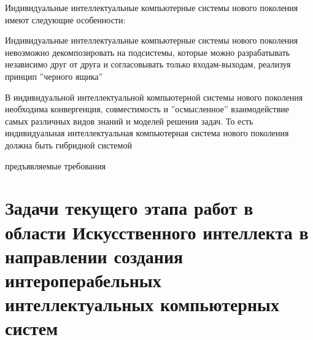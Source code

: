 Индивидуальные интеллектуальные компьютерные системы нового поколения имеют следующие особенности:

\begin{textitemize}
	\item Индивидуальные интеллектуальные компьютерные системы нового поколения невозможно декомпозировать на подсистемы, которые можно разрабатывать независимо друг от друга и согласовывать только входам-выходам, реализуя принцип ''черного ящика''
	\item В индивидуальной интеллектуальной компьютерной системы нового поколения необходима конвергенция, совместимость и ''осмысленное'' взаимодействие самых различных видов знаний и моделей решения задач. То есть индивидуальная интеллектуальная компьютерная система нового поколения должна быть гибридной системой
\end{textitemize}

\begin{SCn}
	\begin{scnrelfromlist}{предъявляемые требования}
	\end{scnrelfromlist}
\end{SCn}

\section*{Задачи текущего этапа работ в области Искусственного интеллекта в направлении создания интероперабельных интеллектуальных компьютерных систем}

